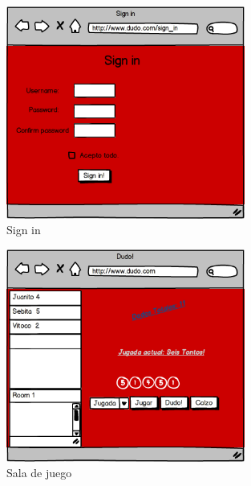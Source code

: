 \documentclass[a4paper,11pt]{article}
\begin{document}
\begin{figure}[h!]
	\centering
	\includegraphics[width=0.7\textwidth]{Sign_in.png}
	\caption{Sign in}
\end{figure}
\newpage
\begin{figure}[h!]
	\centering
	\includegraphics[width=0.7\textwidth]{Sala.png}
	\caption{Sala de juego}
\end{figure}
\end{document}
